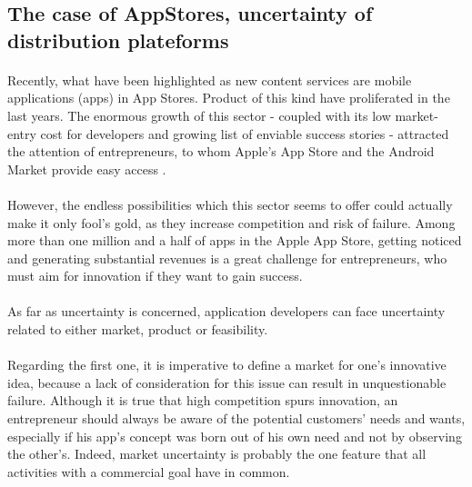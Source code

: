 \documentclass[twoside]{report}
\begin{document}
\subsection{The case of AppStores, uncertainty of distribution plateforms}
\paragraph{}
Recently, what have been highlighted as new content services are mobile applications (apps) in App Stores. Product of this kind have proliferated in the last years. The enormous growth of this sector - coupled with its low market-entry cost for developers and growing list of enviable success stories - attracted the attention of entrepreneurs, to whom Apple's App Store and the Android Market provide easy access \cite{wacheski_anystone_2011}.
\paragraph{}
However, the endless possibilities which this sector seems to offer could actually make it only fool's gold, as they increase competition and risk of failure. Among more than one million and a half of apps in the Apple App Store, getting noticed and generating substantial revenues is a great challenge for entrepreneurs, who must aim for innovation if they want to gain success.
\paragraph{}
As far as uncertainty is concerned, application developers can face uncertainty related to either market, product or feasibility. 
\paragraph{}
Regarding the first one, it is imperative to define a market for one's innovative idea, because a lack of consideration for this issue can result in unquestionable failure. Although it is true that high competition spurs innovation, an entrepreneur should always be aware of the potential customers' needs and wants, especially if his app's concept was born out of his own need and not by observing the other's. Indeed, market uncertainty is probably the one feature that all activities with a commercial goal have in common.
\end{document}

